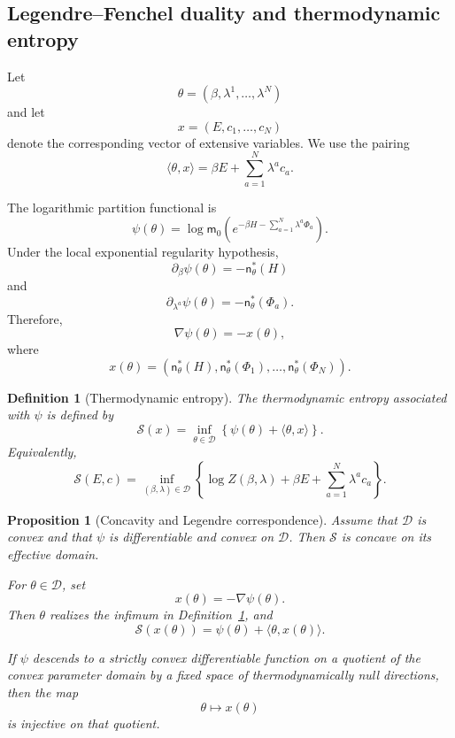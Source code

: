 \documentclass[11pt,reqno]{amsart}
\newtheorem{Proposition}[Theorem]{Proposition}
\newtheorem{Definition}[Theorem]{Definition}
\begin{document}
\subsection{Legendre--Fenchel duality and thermodynamic entropy}
\label{subsec:legendre-duality}

Let
\[
\theta=(\beta,\lambda^1,\ldots,\lambda^N)
\]
and let
\[
x=(E,c_1,\ldots,c_N)
\]
denote the corresponding vector of extensive variables. We use the
pairing
\[
\langle\theta,x\rangle
=
\beta E+\sum_{a=1}^{N}\lambda^a c_a.
\]

The logarithmic partition functional is
\[
\psi(\theta)
=
\log\mathsf m_0
\left(
e^{-\beta H-\sum_{a=1}^{N}\lambda^a\Phi_a}
\right).
\]
Under the local exponential regularity hypothesis,
\[
\partial_\beta\psi(\theta)
=
-\mathsf n_\theta^*(H)
\]
and
\[
\partial_{\lambda^a}\psi(\theta)
=
-\mathsf n_\theta^*(\Phi_a).
\]
Therefore,
\[
\nabla\psi(\theta)
=
-x(\theta),
\]
where
\[
x(\theta)
=
\left(
\mathsf n_\theta^*(H),
\mathsf n_\theta^*(\Phi_1),
\ldots,
\mathsf n_\theta^*(\Phi_N)
\right).
\]

\begin{Definition}[Thermodynamic entropy]
\label{def:thermodynamic-entropy}
The thermodynamic entropy associated with $\psi$ is defined by
\[
\mathcal S(x)
=
\inf_{\theta\in\mathcal D}
\left\{
\psi(\theta)+\langle\theta,x\rangle
\right\}.
\]
Equivalently,
\[
\mathcal S(E,c)
=
\inf_{(\beta,\lambda)\in\mathcal D}
\left\{
\log Z(\beta,\lambda)
+
\beta E
+
\sum_{a=1}^{N}\lambda^a c_a
\right\}.
\]
\end{Definition}

\begin{Proposition}[Concavity and Legendre correspondence]
\label{prop:legendre}
Assume that $\mathcal D$ is convex and that $\psi$ is differentiable
and convex on $\mathcal D$. Then $\mathcal S$ is concave on its
effective domain.

For $\theta\in\mathcal D$, set
\[
x(\theta)=-\nabla\psi(\theta).
\]
Then $\theta$ realizes the infimum in
Definition~\ref{def:thermodynamic-entropy}, and
\[
\mathcal S(x(\theta))
=
\psi(\theta)+\langle\theta,x(\theta)\rangle.
\]

If $\psi$ descends to a strictly convex differentiable function on a
quotient of the convex parameter domain by a fixed space of
thermodynamically null directions, then the map
\[
\theta\longmapsto x(\theta)
\]
is injective on that quotient.
\end{Proposition}
\end{document}
